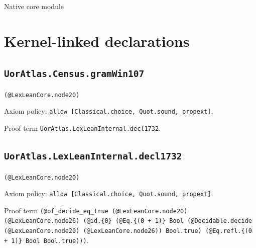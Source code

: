 \documentclass[11pt]{article}
\begin{document}
\begin{center}{\LARGE Native core module}\end{center}
\section*{Kernel-linked declarations}
\subsection*{\texttt{UorAtlas.Census.gramWin107}}
\noindent\texttt{(@LexLeanCore.node20)}\par
\noindent Axiom policy: \texttt{allow [Classical.choice, Quot.sound, propext]}.\par
\noindent Proof term \texttt{UorAtlas.LexLeanInternal.decl1732}.\par
\subsection*{\texttt{UorAtlas.LexLeanInternal.decl1732}}
\noindent\texttt{(@LexLeanCore.node20)}\par
\noindent Axiom policy: \texttt{allow [Classical.choice, Quot.sound, propext]}.\par
\noindent Proof term \texttt{(@of\_decide\_eq\_true (@LexLeanCore.node20) (@LexLeanCore.node26) (@id.\{0\} (@Eq.\{(0 + 1)\} Bool (@Decidable.decide (@LexLeanCore.node20) (@LexLeanCore.node26)) Bool.true) (@Eq.refl.\{(0 + 1)\} Bool Bool.true)))}.\par
\end{document}
